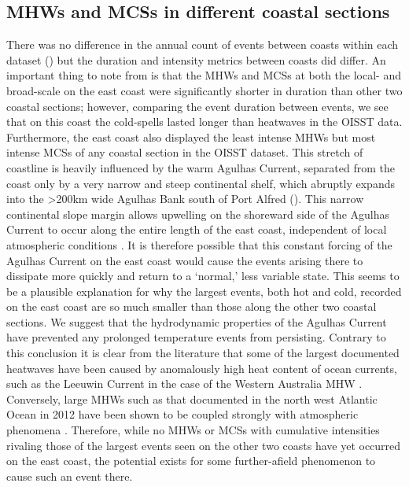 \documentclass[a4paper,10pt,review]{elsarticle}
\begin{document}
\subsection{MHWs and MCSs in different coastal sections}
There was no difference in the annual count of events between coasts within each dataset () but the duration and intensity metrics between coasts did differ. An important thing to note from  is that the MHWs and MCSs at both the local- and broad-scale on the east coast were significantly shorter in duration than other two coastal sections; however, comparing the event duration between events, we see that on this coast the cold-spells lasted longer than heatwaves in the OISST data. Furthermore, the east coast also displayed the least intense MHWs but most intense MCSs of any coastal section in the OISST dataset. This stretch of coastline is heavily influenced by the warm Agulhas Current, separated from the coast only by a very narrow and steep continental shelf, which abruptly expands into the >200km wide Agulhas Bank south of Port Alfred (). This narrow continental slope margin allows upwelling on the shoreward side of the Agulhas Current to occur along the entire length of the east coast, independent of local atmospheric conditions \citep{Lutjeharms2000}. It is therefore possible that this constant forcing of the Agulhas Current on the east coast would cause the events arising there to dissipate more quickly and return to a `normal,' less variable state. This seems to be a plausible explanation for why the largest events, both hot and cold, recorded on the east coast are so much smaller than those along the other two coastal sections. We suggest that the hydrodynamic properties of the Agulhas Current have prevented any prolonged temperature events from persisting. Contrary to this conclusion it is clear from the literature that some of the largest documented heatwaves have been caused by anomalously high heat content of ocean currents, such as the Leeuwin Current in the case of the Western Australia MHW \citep{Feng2013, Pearce2013, Wernberg2013}. Conversely, large MHWs such as that documented in the north west Atlantic Ocean in 2012 have been shown to be coupled strongly with atmospheric phenomena \citep{Mills2012, Chen2014, Chen2015}. Therefore, while no MHWs or MCSs with cumulative intensities rivaling those of the largest events seen on the other two coasts have yet occurred on the east coast, the potential exists for some further-afield phenomenon to cause such an event there.
\end{document}
